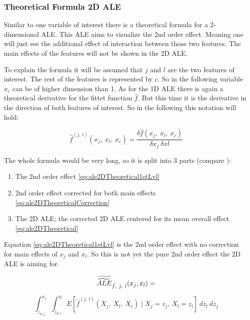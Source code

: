 \documentclass[
]{krantz}
\begin{document}
\hypertarget{theoretical-formula-2d-ale}{%
\subsubsection{Theoretical Formula 2D ALE}\label{theoretical-formula-2d-ale}}

Similar to one variable of interest there is a theoretical formula for a 2-dimensional ALE. This ALE aims to visualize the 2nd order effect. Meaning one will just see the additional effect of interaction between those two features. The main effects of the features will not be shown in the 2D ALE.

To explain the formula it will be assumed that \(j\) and \(l\) are the two features of interest. The rest of the features is represented by \(c\). So in the following variable \(x_c\) can be of higher dimension than 1. As for the 1D ALE there is again a theoretical derivative for the fittet function \(\hat{f}\). But this time it is the derivative in the direction of both features of interest. So in the following this notation will hold:

\[ \hat{f}^{(j,~l)}(x_j,~x_l,~x_c) = \frac{\delta\hat{f}(x_j,~x_l,~x_c)}{\delta x_j~ \delta xl}\]

The whole formula would be very long, so it is split into 3 parts (compare \citep[page 8]{Apley2016}):

\begin{enumerate}
\def\labelenumi{\arabic{enumi}.}
\item
  The 2nd order effect \eqref{eq:ale2DTheoretical1stLvl}
\item
  2nd order effect corrected for both main effects \eqref{eq:ale2DTheoreticalCorrection}
\item
  The 2D ALE; the corrected 2D ALE centered for its mean overall effect \eqref{eq:ale2DTheoretical}
\end{enumerate}

Equation \eqref{eq:ale2DTheoretical1stLvl} is the 2nd order effect with no correction for main effects of \(x_j\) and \(x_l\). So this is not yet the pure 2nd order effect the 2D ALE is aiming for.

\begin{equation} 
\widetilde{\widetilde{ALE}}_{\hat{f},~j,~l}(x_j, x_l) = \notag
\end{equation}

\begin{equation}
\int_{z_{0,j}}^{x_j}  \int_{z_{0,l}}^{x_l} E[\hat{f}^{(j,~l)}(X_j,~X_l,~X_c)\mid X_j = z_j,~X_l = z_l]~dz_l~dz_j 
  \label{eq:ale2DTheoretical1stLvl}
\end{equation}
\end{document}
